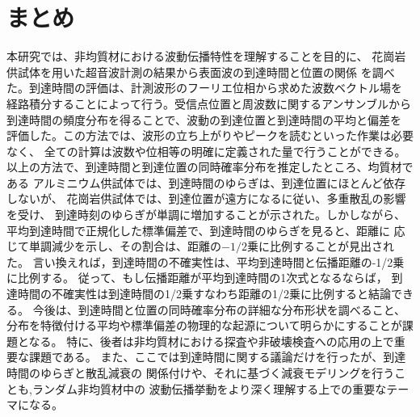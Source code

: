 \documentclass{jsce}
\begin{document}
\section{まとめ}
本研究では、非均質材における波動伝播特性を理解することを目的に、
花崗岩供試体を用いた超音波計測の結果から表面波の到達時間と位置の関係
を調べた。到達時間の評価は、計測波形のフーリエ位相から求めた波数ベクトル場を
経路積分することによって行う。受信点位置と周波数に関するアンサンブルから
到達時間の頻度分布を得ることで、波動の到達位置と到達時間の平均と偏差を
評価した。この方法では、波形の立ち上がりやピークを読むといった作業は必要なく、
全ての計算は波数や位相等の明確に定義された量で行うことができる。
以上の方法で、到達時間と到達位置の同時確率分布を推定したところ、均質材である
アルミニウム供試体では、到達時間のゆらぎは、到達位置にほとんど依存しないが、
花崗岩供試体では、到達位置が遠方になるに従い、多重散乱の影響を受け、
到達時刻のゆらぎが単調に増加することが示された。しかしながら、
平均到達時間で正規化した標準偏差で、到達時間のゆらぎを見ると、距離に
応じて単調減少を示し、その割合は、距離の$-1/2$乗に比例することが見出された。
言い換えれば，到達時間の不確実性は、平均到達時間と伝播距離の-1/2乗に比例する。
従って、もし伝播距離が平均到達時間の1次式となるならば，
到達時間の不確実性は到達時間の1/2乗すなわち距離の1/2乗に比例すると結論できる。
今後は、到達時間と位置の同時確率分布の詳細な分布形状を調べること、
分布を特徴付ける平均や標準偏差の物理的な起源について明らかにすることが課題となる。
特に、後者は非均質材における探査や非破壊検査への応用の上で重要な課題である。
また、ここでは到達時間に関する議論だけを行ったが、到達時間のゆらぎと散乱減衰の
関係付けや、それに基づく減衰モデリングを行うことも,ランダム非均質材中の
波動伝播挙動をより深く理解する上での重要なテーマになる。
\vspace{0mm}
\end{document}
